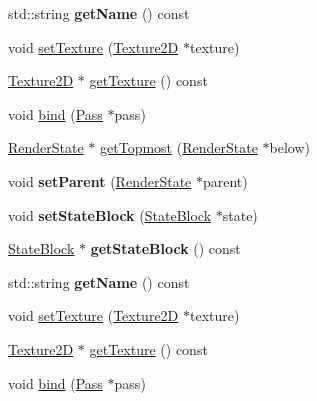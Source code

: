 \begin{DoxyCompactItemize}
\item 
\mbox{\label{classRenderState_a70c406fd858ffe868b9e02c39a6e4318}} 
std\+::string {\bfseries get\+Name} () const
\item 
void \hyperlink{classRenderState_ae41fdde5c9e67eb4e5967c8de711cda6}{set\+Texture} (\hyperlink{classTexture2D}{Texture2D} $\ast$texture)
\item 
\hyperlink{classTexture2D}{Texture2D} $\ast$ \hyperlink{classRenderState_ad0b5d7ef008d158d45b2fec637d77e2b}{get\+Texture} () const
\item 
void \hyperlink{classRenderState_a2b509af29faeef89bab4f7afcc7cfbd0}{bind} (\hyperlink{classPass}{Pass} $\ast$pass)
\item 
\hyperlink{classRenderState}{Render\+State} $\ast$ \hyperlink{classRenderState_a58585f74d7be453fcafb04924e06e157}{get\+Topmost} (\hyperlink{classRenderState}{Render\+State} $\ast$below)
\item 
\mbox{\label{classRenderState_a2b56c80271b7c22a955eee179e7bc3b6}} 
void {\bfseries set\+Parent} (\hyperlink{classRenderState}{Render\+State} $\ast$parent)
\item 
\mbox{\label{classRenderState_a7f170584fc0639b61737f342997e8f56}} 
void {\bfseries set\+State\+Block} (\hyperlink{classRenderState_1_1StateBlock}{State\+Block} $\ast$state)
\item 
\mbox{\label{classRenderState_a28679277752a09d6659cb633ac5df5b0}} 
\hyperlink{classRenderState_1_1StateBlock}{State\+Block} $\ast$ {\bfseries get\+State\+Block} () const
\item 
\mbox{\label{classRenderState_a70c406fd858ffe868b9e02c39a6e4318}} 
std\+::string {\bfseries get\+Name} () const
\item 
void \hyperlink{classRenderState_ae41fdde5c9e67eb4e5967c8de711cda6}{set\+Texture} (\hyperlink{classTexture2D}{Texture2D} $\ast$texture)
\item 
\hyperlink{classTexture2D}{Texture2D} $\ast$ \hyperlink{classRenderState_abca42dbf8d2b368e5fe8c04316feeff7}{get\+Texture} () const
\item 
void \hyperlink{classRenderState_a2b509af29faeef89bab4f7afcc7cfbd0}{bind} (\hyperlink{classPass}{Pass} $\ast$pass)

\end{DoxyCompactItemize}
